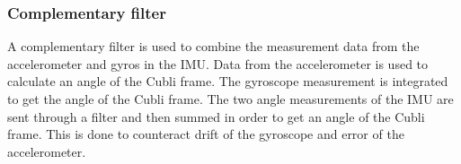 \subsubsection{Complementary filter}
A complementary filter is used to combine the measurement data from the accelerometer and gyros in the IMU. 
Data from the accelerometer is used to calculate an angle of the Cubli frame.
The gyroscope measurement is integrated to get the angle of the Cubli frame.
The two angle measurements of the IMU are sent through a filter and then summed in order to get an angle of the Cubli frame.
This is done to counteract drift of the gyroscope and error of the accelerometer. 
